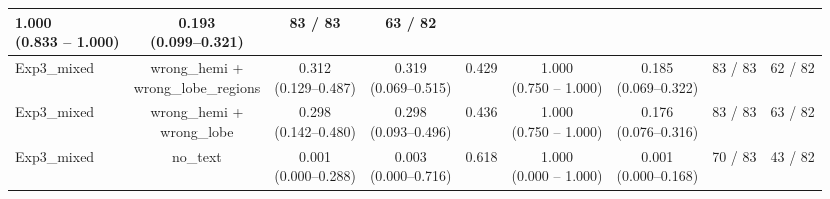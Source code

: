 \documentclass[a4paper,12pt]{article}
\begin{document}
\begin{table}[ht]
\begin{tabular}{lcccccccc}
\makecell{1.000 \\ (0.833 -- 1.000)} &
\makecell{\colorbox{orange!20}{0.193} \\ (0.099--0.321)} &
83 / 83 &
\colorbox{green!20}{63 / 82} \\
\hline
Exp3\_mixed &
\makecell{wrong\_hemi + \\ wrong\_lobe\_regions} &
\makecell{0.312 \\ (0.129--0.487)} &
\makecell{\colorbox{blue!20}{0.319} \\ (0.069--0.515)} &
0.429 &
\makecell{1.000 \\ (0.750 -- 1.000)} &
\makecell{0.185 \\ (0.069--0.322)} &
83 / 83 &
\colorbox{blue!20}{62 / 82} \\
\hline
Exp3\_mixed &
\makecell{wrong\_hemi + \\ wrong\_lobe} &
\makecell{0.298 \\ (0.142--0.480)} &
\makecell{\colorbox{orange!20}{0.298} \\ (0.093--0.496)} &
0.436 &
\makecell{1.000 \\ (0.750 -- 1.000)} &
\makecell{0.176 \\ (0.076--0.316)} &
83 / 83 &
\colorbox{green!20}{63 / 82} \\
\hline
Exp3\_mixed &
no\_text &
\makecell{0.001 \\ (0.000--0.288)} &
\makecell{0.003 \\ (0.000--0.716)} &
\colorbox{blue!20}{0.618} &
\makecell{1.000 \\ (0.000 -- 1.000)} &
\makecell{0.001 \\ (0.000--0.168)} &
70 / 83 &
43 / 82 \\
\hline
\end{tabular}
\end{table}
\end{document}
